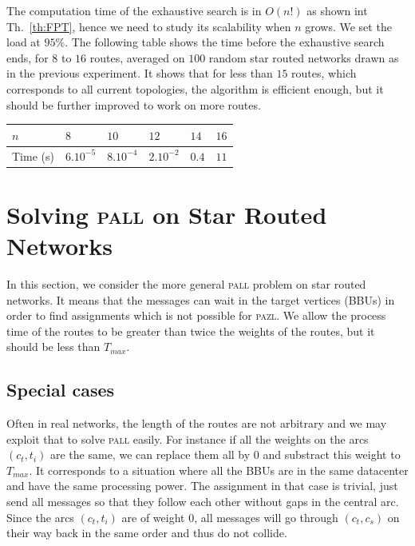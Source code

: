 \documentclass[10pt, conference, letterpaper]{IEEEtran}
\newcommand\pazl{\textsc{pazl}\xspace}
\newcommand\pall{\textsc{pall}\xspace}
\begin{document}
      The computation time of the exhaustive search is in $O(n!)$ as shown int Th.~\ref{th:FPT}, hence we need to study its scalability when $n$ grows. We set the load at $95\%$.
%       
      The following table shows the time before the exhaustive search ends, for $8$ to $16$ routes, averaged on $100$ random star routed networks drawn as in the previous experiment. It shows that for less than $15$ routes, which corresponds to all current topologies, the algorithm is efficient enough, but it should be further improved to work on more routes.
         \begin{center}
         \begin{tabularx}{0.5\textwidth}{|l|X|X|X|X|X|}
    \hline
   $n$ & $8$ & $10$& $12$&$14$& $16$\\
    \hline
   Time (s) & $6.10^{-5}$&$8.10^{-4}$&$2.10^{-2}$& $0.4$& $11$\\
    \hline
      \end{tabularx}
      \end{center}
      
         \section{Solving \pall on Star Routed Networks}\label{sec:PALL}
    
    In this section, we consider the more general \pall problem on star routed networks. It means that the messages can wait in the target vertices (BBUs) in order to find assignments which is not possible for \pazl. We allow the process time of the routes to be greater than twice the weights of the routes, but it should be less than $T_{max}$.

	\subsection{Special cases}
		
		
	Often in real networks, the length of the routes are not arbitrary and we may exploit that to solve \pall easily. For instance if all the weights on the arcs $(c_t,t_i)$ are the same, we can replace them all by $0$ and substract this weight to $T_{max}$. It corresponds to a situation where all the BBUs are in the same datacenter and have the same processing power.
	The assignment in that case is trivial, just send all messages so that they follow each other without gaps in the central arc. Since the arcs $(c_t,t_i)$ are of weight $0$, all messages will go through $(c_t,c_s)$ on their way back in
	the same order and thus do not collide. 
	
\end{document}
